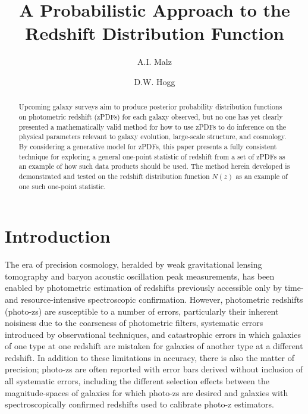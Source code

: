 \documentclass[preprint]{aastex}
\begin{document}
\title{A Probabilistic Approach to the Redshift Distribution Function}

\author{A.I. Malz}

\author{D.W. Hogg}

\begin{abstract}
Upcoming galaxy surveys aim to produce posterior probability distribution functions on photometric redshift (zPDFs) for each galaxy observed, but no one has yet clearly presented a mathematically valid method for how to use zPDFs to do inference on the physical parameters relevant to galaxy evolution, large-scale structure, and cosmology.  By considering a generative model for zPDFs, this paper presents a fully consistent technique for exploring a general one-point statistic of redshift from a set of zPDFs as an example of how such data products should be used.  The method herein developed is demonstrated and tested on the redshift distribution function $N(z)$ as an example of one such one-point statistic.
\end{abstract}


\clearpage
\section{Introduction}
\label{sec:intro}

The era of precision cosmology, heralded by weak gravitational lensing tomography and baryon acoustic oscillation peak measurements, has been enabled by photometric estimation of redshifts previously accessible only by time- and resource-intensive spectroscopic confirmation.  However, photometric redshifts (photo-zs) are susceptible to a number of errors, particularly their inherent noisiness due to the coarseness of photometric filters, systematic errors introduced by observational techniques, and catastrophic errors in which galaxies of one type at one redshift are mistaken for galaxies of another type at a different redshift.  In addition to these limitations in accuracy, there is also the matter of precision; photo-zs are often reported with error bars derived without inclusion of all systematic errors, including the different selection effects between the magnitude-spaces of galaxies for which photo-zs are desired and galaxies with spectroscopically confirmed redshifts used to calibrate photo-z estimators.
\end{document}
